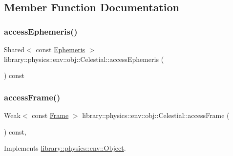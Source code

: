 \subsection{Member Function Documentation}
\mbox{\label{classlibrary_1_1physics_1_1env_1_1obj_1_1_celestial_ab56fff3f2f1508dee79fa7410d67e300}} 
\subsubsection{\texorpdfstring{access\+Ephemeris()}{accessEphemeris()}}
{\footnotesize\ttfamily Shared$<$ const \hyperlink{classlibrary_1_1physics_1_1env_1_1_ephemeris}{Ephemeris} $>$ library\+::physics\+::env\+::obj\+::\+Celestial\+::access\+Ephemeris (\begin{DoxyParamCaption}{ }\end{DoxyParamCaption}) const}

\mbox{\label{classlibrary_1_1physics_1_1env_1_1obj_1_1_celestial_a2c3035480bad1749f12d1170113ba2ad}} 
\subsubsection{\texorpdfstring{access\+Frame()}{accessFrame()}}
{\footnotesize\ttfamily Weak$<$ const \hyperlink{classlibrary_1_1physics_1_1coord_1_1_frame}{Frame} $>$ library\+::physics\+::env\+::obj\+::\+Celestial\+::access\+Frame (\begin{DoxyParamCaption}{ }\end{DoxyParamCaption}) const\hspace{0.3cm}{\ttfamily [override]}, {\ttfamily [virtual]}}



Implements \hyperlink{classlibrary_1_1physics_1_1env_1_1_object_a304d1fc452fbe6a45ef5f55591a0787a}{library\+::physics\+::env\+::\+Object}.

